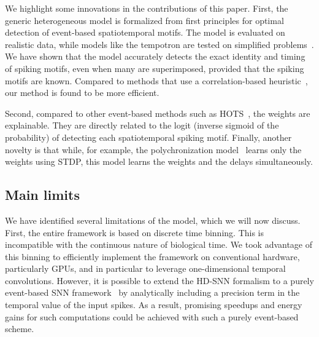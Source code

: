 \documentclass[runningheads]{llncs}
\newcommand{\ms}{\si{\milli\second}}%
\begin{document}
We highlight some innovations in the contributions of this paper. First, the generic heterogeneous model is formalized from first principles for optimal detection of event-based spatiotemporal motifs. The model is evaluated on realistic data, while models like the tempotron are tested on simplified problems~\cite{gutig_tempotron_2006}. We have shown that the model accurately detects the exact identity and timing of spiking motifs, even when many are superimposed, provided that the spiking motifs are known. Compared to methods that use a correlation-based heuristic~\cite{ghosh_spatiotemporal_2019,yu_stsc-snn_2022}, our method is found to be more efficient. 

Second, compared to other event-based methods such as HOTS~\cite{lagorce_hots_2017}, the weights are explainable. They are directly related to the logit (inverse sigmoid of the probability) of detecting each spatiotemporal spiking motif. Finally, another novelty is that while, for example, the polychronization model~\cite{izhikevich_polychronization_2006} learns only the weights using STDP, this model learns the weights and the delays simultaneously.%

\subsection{Main limits}
We have identified several limitations of the model, which we will now discuss. First, the entire framework is based on discrete time binning. This is incompatible with the continuous nature of biological time. We took advantage of this binning to efficiently implement the framework on conventional hardware, particularly GPUs, and in particular to leverage one-dimensional temporal convolutions.
However, it is possible to extend the HD-SNN formalism to a purely event-based SNN framework~\cite{grimaldi_robust_2023} by analytically including a precision term in the temporal value of the input spikes. As a result, promising speedups and energy gains for such computations could be achieved with such a purely event-based scheme.
\end{document}
